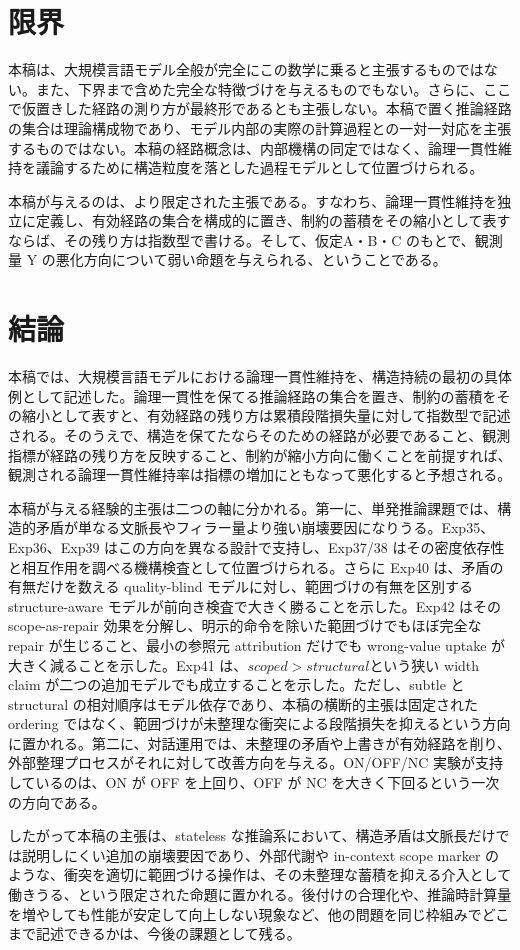 \documentclass[12pt,a4paper]{article}
\begin{document}
\section{限界}\label{ux9650ux754c}

本稿は、大規模言語モデル全般が完全にこの数学に乗ると主張するものではない。また、下界まで含めた完全な特徴づけを与えるものでもない。さらに、ここで仮置きした経路の測り方が最終形であるとも主張しない。本稿で置く推論経路の集合は理論構成物であり、モデル内部の実際の計算過程との一対一対応を主張するものではない。本稿の経路概念は、内部機構の同定ではなく、論理一貫性維持を議論するために構造粒度を落とした過程モデルとして位置づけられる。

本稿が与えるのは、より限定された主張である。すなわち、論理一貫性維持を独立に定義し、有効経路の集合を構成的に置き、制約の蓄積をその縮小として表すならば、その残り方は指数型で書ける。そして、仮定A・B・C のもとで、観測量 Y の悪化方向について弱い命題を与えられる、ということである。

\section{結論}\label{ux7d50ux8ad6}

本稿では、大規模言語モデルにおける論理一貫性維持を、構造持続の最初の具体例として記述した。論理一貫性を保てる推論経路の集合を置き、制約の蓄積をその縮小として表すと、有効経路の残り方は累積段階損失量に対して指数型で記述される。そのうえで、構造を保てたならそのための経路が必要であること、観測指標が経路の残り方を反映すること、制約が縮小方向に働くことを前提すれば、観測される論理一貫性維持率は指標の増加にともなって悪化すると予想される。

本稿が与える経験的主張は二つの軸に分かれる。第一に、単発推論課題では、構造的矛盾が単なる文脈長やフィラー量より強い崩壊要因になりうる。Exp35、Exp36、Exp39 はこの方向を異なる設計で支持し、Exp37/38 はその密度依存性と相互作用を調べる機構検査として位置づけられる。さらに Exp40 は、矛盾の有無だけを数える quality-blind モデルに対し、範囲づけの有無を区別する structure-aware モデルが前向き検査で大きく勝ることを示した。Exp42 はその scope-as-repair 効果を分解し、明示的命令を除いた範囲づけでもほぼ完全な repair が生じること、最小の参照元 attribution だけでも wrong-value uptake が大きく減ることを示した。Exp41 は、\(scoped > structural\)という狭い width claim が二つの追加モデルでも成立することを示した。ただし、subtle と structural の相対順序はモデル依存であり、本稿の横断的主張は固定された ordering ではなく、範囲づけが未整理な衝突による段階損失を抑えるという方向に置かれる。第二に、対話運用では、未整理の矛盾や上書きが有効経路を削り、外部整理プロセスがそれに対して改善方向を与える。ON/OFF/NC 実験が支持しているのは、ON が OFF を上回り、OFF が NC を大きく下回るという一次の方向である。

したがって本稿の主張は、stateless な推論系において、構造矛盾は文脈長だけでは説明しにくい追加の崩壊要因であり、外部代謝や in-context scope marker のような、衝突を適切に範囲づける操作は、その未整理な蓄積を抑える介入として働きうる、という限定された命題に置かれる。後付けの合理化や、推論時計算量を増やしても性能が安定して向上しない現象など、他の問題を同じ枠組みでどこまで記述できるかは、今後の課題として残る。
\end{document}
